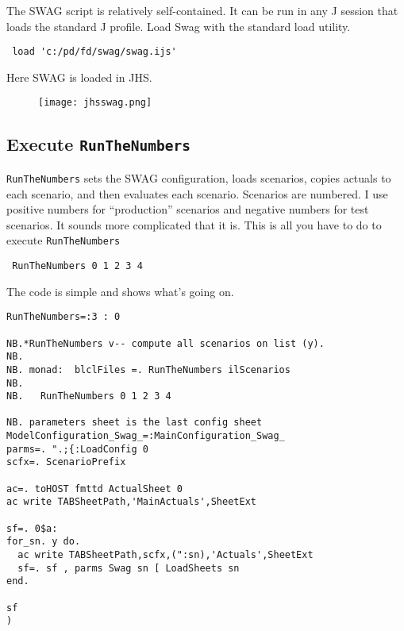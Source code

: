 The SWAG script is relatively self-contained. It can be run in any J
session that loads the standard J profile. Load Swag with the standard
load utility.

\begin{verbatim}
 load 'c:/pd/fd/swag/swag.ijs'
\end{verbatim}

\noindent Here SWAG is loaded in JHS.


\captionsetup[figure]{labelformat=empty}
\begin{figure}[htbp]
\centering
\texttt{[image: jhsswag.png]}
\label{fig:5175X0}
\end{figure}

\subsection*{Execute \texttt{RunTheNumbers}}

\texttt{RunTheNumbers} sets the SWAG configuration, loads scenarios, copies
actuals to each scenario, and then evaluates each scenario. Scenarios
are numbered. I use positive numbers for ``production'' scenarios and
negative numbers for test scenarios. It sounds more complicated that it
is. This is all you have to do to execute \texttt{RunTheNumbers}

\begin{verbatim}
 RunTheNumbers 0 1 2 3 4 
\end{verbatim}

\noindent The code is simple and shows what's going on.

\begin{lstlisting}[language=jdoc, frame=single,framerule=0pt,label=lst:scr5175X0]
RunTheNumbers=:3 : 0

NB.*RunTheNumbers v-- compute all scenarios on list (y).
NB.
NB. monad:  blclFiles =. RunTheNumbers ilScenarios
NB.
NB.   RunTheNumbers 0 1 2 3 4

NB. parameters sheet is the last config sheet
ModelConfiguration_Swag_=:MainConfiguration_Swag_
parms=. ".;{:LoadConfig 0
scfx=. ScenarioPrefix

ac=. toHOST fmttd ActualSheet 0
ac write TABSheetPath,'MainActuals',SheetExt

sf=. 0$a:
for_sn. y do.
  ac write TABSheetPath,scfx,(":sn),'Actuals',SheetExt
  sf=. sf , parms Swag sn [ LoadSheets sn
end.

sf 
)
\end{lstlisting}

